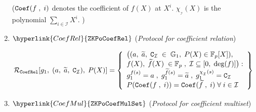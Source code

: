 \documentclass[11pt, lettersize, notitlepage, leqno, footskip=0.6cm]{article}
\newcommand{\bFp}{\mathbb{F}_p}
\newcommand{\wti}{\widetilde}
\newcommand{\mc}{\mathcal}
\newcommand{\mb}{\mathbb}
\newcommand{\sub}{\subseteq}
\newcommand{\noin}{\noindent}
\numberwithin{equation}{section}
\begin{document}
\begin{enumerate}[wide, labelwidth=!, labelindent=0pt, itemsep=-0.2ex]
\noin (${\tt{Coef}}(f\;,\; i)$ denotes the coefficient of $f(X)$ at $X^i$. $\chi_{_\mc{I}}(X)$ is the polynomial $\sum\limits_{i\in \mc{I}} X^i$. )




\begin{comment} \item $\hyperlink{AllNZCoef}{\tt{ZKPoAllNZCoef}}$ (\textit{Protocol for the set of all non-zero coefficients}) \vspace{-3mm}



$$\mc{R}_{\tt{AllNZCoef}}[g_1,\;(a,\;\;\wti{a}_{\tt{nz}})] = \left\{\begin{array}{l} \big((a,\;  \wti{a}_{\tt{nz}}\;\in\;\mb{G}_1),\\
f(X)\in \bFp\;,\; \mc{I} \sub [0,\;\deg(f)]\big): \\
g_1^{f(s)} = a\;,\;g_1^{\chi_{_\mc{I}}(s)} = \wti{a}_{\tt{nz}} \\
{\tt{Coef}}(f\;,\; i)\neq 0 \;\forall\; i\in \mc{I}\\
{\tt{Coef}}(f\;,\; i) = 0 \;\forall\; i\notin \mc{I}
\end{array}\right\}  $$ \end{comment}




\item $\hyperlink{CoefRel}{\tt{ZKPoCoefRel}}$ (\textit{Protocol for coefficient relation}) \vspace{-3mm}


$$\mc{R}_{\tt{CoefRel}}[g_1,\;(a,\;\wti{a},\; {\tt{C}}_{\mc{I}} ),\; P(X)] = \left\{\begin{array}{l} \big((a,\;  \wti{a},\;{\tt{C}}_{\mc{I}}\;\in\;\mb{G}_1,\; P(X)\in \bFp[X]),\\
f(X),\;\wti{f}(X)\;\in \bFp\;,\; \mc{I} \sub [0,\;\deg(f)]\big): \\
g_1^{f(s)} = a\;,\;g_1^{\wti{f}(s)} = \wti{a}\;,\;g_1^{\chi_{_{\mc{I}}}(s)} = \tt{C}_{\mc{I}} \\ \vspace{0.5mm}
P({\tt{Coef}}(f\;,\; i)) = {\tt{Coef}}(\wti{f}\;,\; i) \;\forall\; i\in \mc{I}\\

\end{array}\right\}  $$

\item $\hyperlink{CoefMul}{\tt{ZKPoCoefMulSet}}$ (\textit{Protocol for coefficient multiset}) \vspace{-3mm}



\end{enumerate}
\end{document}
